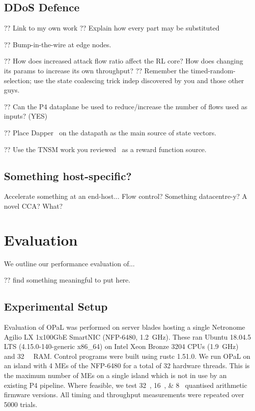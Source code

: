 \documentclass[sigconf,natbib=false]{acmart}
\newcommand{\approachshort}{OPaL}
\begin{document}
\subsection{DDoS Defence}\label{sec:integ-1}
?? Link to my own work
?? Explain how every part may be substituted

?? Bump-in-the-wire at edge nodes.

?? How does increased attack flow ratio affect the RL core? How does changing its params to increase its own throughput?
?? Remember the timed-random-selection; use the state coalescing trick indep discovered by you and those other guys.

?? Can the P4 dataplane be used to reduce/increase the number of flows used as inputs? (YES)

?? Place Dapper~\parencite{DBLP:conf/sosr/GhasemiBR17} on the datapath as the main source of state vectors.

?? Use the TNSM work you reviewed~\parencite{tnms-ddos-victim-ident} as a reward function source.

\subsection{Something host-specific?}\label{sec:integ-2}
Accelerate something at an end-host... Flow control? Something datacentre-y? A novel CCA? What?

\section{Evaluation}\label{sec:evaluation}
We outline our performance evaluation of...

?? find something meaningful to put here.

\subsection{Experimental Setup}
Evaluation of \approachshort{} was performed on server blades hosting a single Netronome Agilio LX 1x100GbE SmartNIC (NFP-6480, \SI{1.2}{\giga\hertz}).
These ran Ubuntu 18.04.5 LTS (4.15.0-140-generic x86\_64) on Intel Xeon Bronze 3204 CPUs (\SI{1.9}{\giga\hertz}) and \SI{32}{\gibi\byte} RAM.
Control programs were built using rustc 1.51.0.
We run \approachshort{} on an island with \num{4} MEs of the NFP-6480 for a total of \num{32} hardware threads.
This is the maximum number of MEs on a single island which is not in use by an existing P4 pipeline.
Where feasible, we test \SIlist{32;16;8}{\bit} quantised arithmetic firmware versions.
All timing and throughput measurements were repeated over \num{5000} trials.
\end{document}
